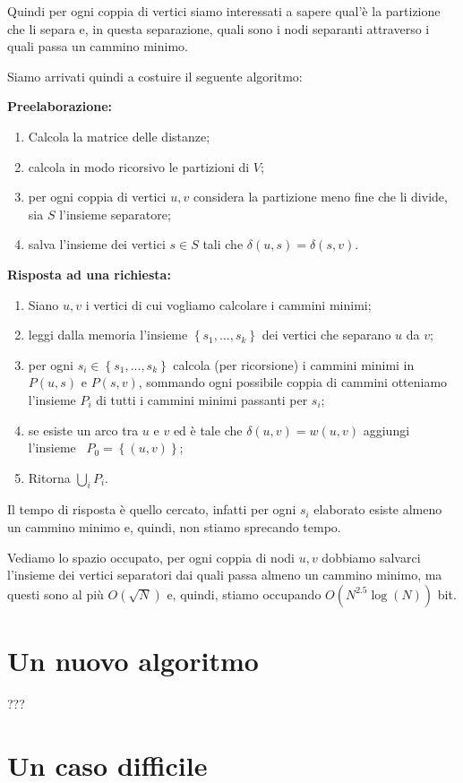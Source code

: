 \documentclass[a4paper,10pt]{amsbook}
\theoremstyle{plain}
\theoremstyle{definition}
\theoremstyle{remark}
\newcommand{\set}[1]{\left\{#1\right\}}
\newcommand{\pa}[1]{\left(#1\right)}
\begin{document}
Quindi per ogni coppia di vertici siamo interessati a sapere qual'\`e
la partizione che li separa e, in questa separazione, quali sono i
nodi separanti attraverso i quali passa un cammino minimo.

Siamo arrivati quindi a costuire il seguente algoritmo:

\textbf{Preelaborazione:}
\begin{enumerate}
\item Calcola la matrice delle distanze;
\item calcola in modo ricorsivo le partizioni di $V$;
\item per ogni coppia di vertici $u,v$ considera la partizione meno
  fine che li divide, sia $S$ l'insieme separatore;
\item salva l'insieme dei vertici $s\in S$ tali che $\delta\pa{u,s} =
  \delta\pa{s,v}$.
\end{enumerate}

\textbf{Risposta ad una richiesta:}
\begin{enumerate}
\item Siano $u,v$ i vertici di cui vogliamo calcolare i cammini minimi;
\item leggi dalla memoria l'insieme $\set{s_1,...,s_k}$ dei vertici che
  separano $u$ da $v$;
\item per ogni $s_i \in \set{s_1,...,s_k}$ calcola (per ricorsione) i
  cammini minimi in $P(u,s)$ e $P(s,v)$, sommando ogni possibile
  coppia di cammini otteniamo l'insieme $P_i$ di tutti i cammini
  minimi passanti per $s_i$;
\item se esiste un arco tra $u$ e $v$ ed \`e tale che $\delta\pa{ u,v}
  = w(u,v)$ aggiungi l'insieme~ $P_0 = \set{ (u,v) }$;
\item Ritorna $\bigcup _i P_i$.
\end{enumerate}

Il tempo di risposta \`e quello cercato, infatti per ogni $s_i$
elaborato esiste almeno un cammino minimo e, quindi, non stiamo
sprecando tempo.

Vediamo lo spazio occupato, per ogni coppia di nodi $u,v$ dobbiamo
salvarci l'insieme dei vertici separatori dai quali passa almeno un
cammino minimo, ma questi sono al pi\`u $O\pa{ \sqrt{N}}$ e, quindi,
stiamo occupando $O\pa{ N^{2.5} \log\pa{ N} }$ bit.

\section{Un nuovo algoritmo}

???

\section{Un caso difficile}





\end{document}
